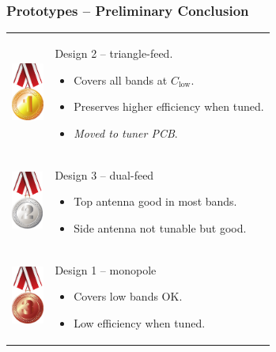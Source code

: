 \begin{frame}
    \frametitle{Prototypes -- Preliminary Conclusion}
    \begin{tabular}{m{0.4in}m{4in}}
        \rule{0pt}{0.9in}\includegraphics[height=0.75in]{img/soren/1st.pdf} & 
            Design 2 -- triangle-feed.
            \begin{itemize}
                \item Covers all bands at $C_{\text{low}}$.
                \item Preserves higher efficiency when tuned.
                \item \textit{Moved to tuner PCB}.
            \end{itemize}
            \\
        \rule{0pt}{0.9in}\includegraphics[height=0.75in]{img/soren/2nd.pdf} & 
            Design 3 -- dual-feed
            \begin{itemize}
                \item Top antenna good in most bands.
                \item Side antenna not tunable but good.
            \end{itemize}
            \\
        \rule{0pt}{0.9in}\includegraphics[height=0.75in]{img/soren/3rd.pdf} & 
            Design 1 -- monopole
            \begin{itemize}
                \item Covers low bands OK.
                \item Low efficiency when tuned.
            \end{itemize}
    \end{tabular}
\end{frame}
